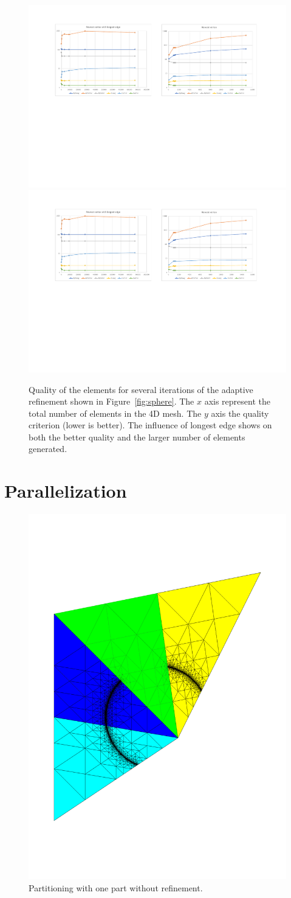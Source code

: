 \documentclass{article}
\begin{document}
\begin{figure}[htbp]
	\centering
	\includegraphics[width=0.48\linewidth]{figures/NewestVertex_Recursive} \hfill
	\includegraphics[width=0.48\linewidth]{figures/NewestVertex_and_LongestEdge_Recursive} 

	\caption{Quality of the elements for several iterations of the adaptive refinement shown in Figure~\ref{fig:sphere}. The $x$ axis represent the total number of elements in the 4D mesh. The $y$ axis the quality criterion (lower is better). The influence of longest edge shows on both the better quality and the larger number of elements generated.}
	\label{fig:quality}
\end{figure}


\section{Parallelization}

\begin{figure}[htbp]
	\centering
	\includegraphics[width=0.8\linewidth]{figures/partitioning_with_one_part_without_refinement}
	\caption{Partitioning with one part without refinement.}
	\label{fig:metrics}
\end{figure}
\end{document}
